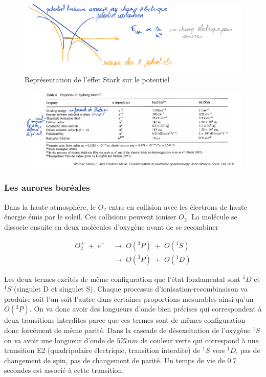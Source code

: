 \begin{figure}[H]
    \centering
    \includegraphics[width=\textwidth]{Images2/DessinStark.PNG}
    \caption{Représentation de l'effet Stark sur le potentiel}
    \label{fig:fig_stark}
\end{figure}
\begin{figure}[htp]
    \centering
    \includegraphics[width=\textwidth]{Images2/TableauStark.PNG}
\end{figure}




\subsubsection{Les aurores boréales}

Dans la haute atmosphère, le $O_2$ entre en collision avec les électrons de haute énergie émis par le soleil. Ces collisions peuvent ioniser $O_2$. La molécule se dissocie ensuite en deux molécules d'oxygène avant de se recombiner

\begin{align*}
    O_2^+ \; + \; e^- \; &\longrightarrow \;O(^3P)\; +\; O(^1S)  \\
    &\longrightarrow\; O(^3P)\; +\; O(^1D)
\end{align*}

Les deux termes excités de même configuration que l'état fondamental sont $^1D$ et $^1S$ (singulet D et singulet S). Chaque processus d'ionisation-recombinaison va produire soit l'un soit l'autre dans certaines proportions mesurables ainsi qu'un $O(^3P)$. On va donc avoir des longueurs d'onde bien précises qui correspondent à deux transitions interdites parce que ces termes sont de mêmes configuration donc forcément de même parité. Dans la cascade de désexcitation de l'oxygène $^1S$ on va avoir une longueur d'onde de $527nm$ de couleur verte qui correspond à une transition E2 (quadripolaire électrique, transition interdite) de  $^1S$ vers $^1D$, pas de changement de spin, pas de changement de parité. Un temps de vie de 0.7 secondes est associé à cette transition.\\

